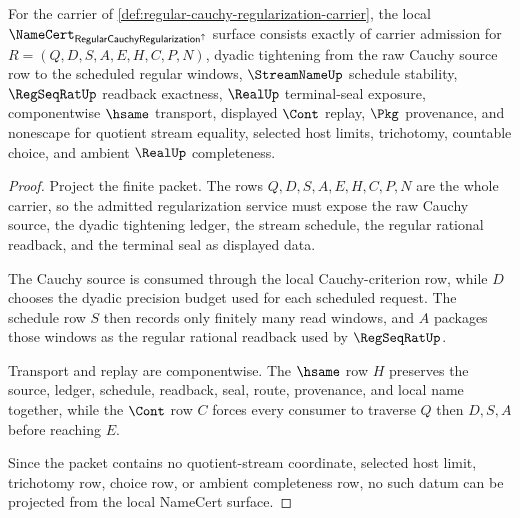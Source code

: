 \begin{theorem}
\label{thm:regular-cauchy-regularization-namecert-obligations}
For the carrier of \autoref{def:regular-cauchy-regularization-carrier}, the local $\NameCert_{\RegularCauchyRegularizationUp}$ surface consists exactly of carrier admission for $R=(Q,D,S,A,E,H,C,P,N)$, dyadic tightening from the raw Cauchy source row to the scheduled regular windows, $\StreamNameUp$ schedule stability, $\RegSeqRatUp$ readback exactness, $\RealUp$ terminal-seal exposure, componentwise $\hsame$ transport, displayed $\Cont$ replay, $\Pkg$ provenance, and nonescape for quotient stream equality, selected host limits, trichotomy, countable choice, and ambient $\RealUp$ completeness.
\end{theorem}
\begin{proof}
Project the finite packet. The rows $Q,D,S,A,E,H,C,P,N$ are the whole carrier, so the admitted regularization service must expose the raw Cauchy source, the dyadic tightening ledger, the stream schedule, the regular rational readback, and the terminal seal as displayed data.

The Cauchy source is consumed through the local Cauchy-criterion row, while $D$ chooses the dyadic precision budget used for each scheduled request. The schedule row $S$ then records only finitely many read windows, and $A$ packages those windows as the regular rational readback used by $\RegSeqRatUp$.

Transport and replay are componentwise. The $\hsame$ row $H$ preserves the source, ledger, schedule, readback, seal, route, provenance, and local name together, while the $\Cont$ row $C$ forces every consumer to traverse $Q$ then $D,S,A$ before reaching $E$.

Since the packet contains no quotient-stream coordinate, selected host limit, trichotomy row, choice row, or ambient completeness row, no such datum can be projected from the local NameCert surface.
\end{proof}

